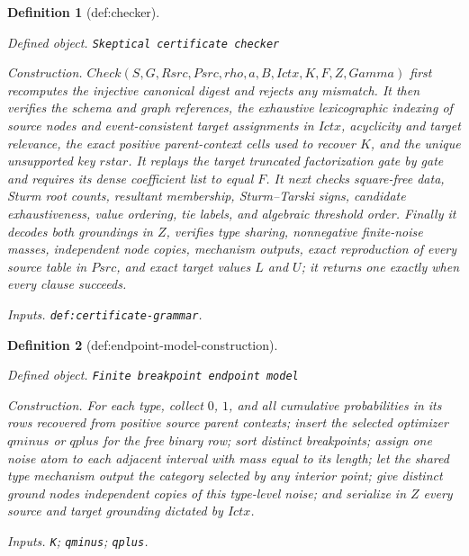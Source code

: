 \documentclass{article}
\newtheorem{definition}{Definition}
\begin{document}
\begin{definition}[def:checker]\label{def:checker}
\par\smallskip\noindent\emph{Defined object.} \texttt{Skeptical certificate checker}
\par\smallskip\noindent\emph{Construction.} \(Check(S,G,Rsrc,Psrc,rho,a,B,Ictx,K,F,Z,Gamma)\) first recomputes the injective canonical digest and rejects any mismatch. It then verifies the schema and graph references, the exhaustive lexicographic indexing of source nodes and event-consistent target assignments in \(Ictx\), acyclicity and target relevance, the exact positive parent-context cells used to recover \(K\), and the unique unsupported key \(rstar\). It replays the target truncated factorization gate by gate and requires its dense coefficient list to equal \(F\). It next checks square-free data, Sturm root counts, resultant membership, Sturm--Tarski signs, candidate exhaustiveness, value ordering, tie labels, and algebraic threshold order. Finally it decodes both groundings in \(Z\), verifies type sharing, nonnegative finite-noise masses, independent node copies, mechanism outputs, exact reproduction of every source table in \(Psrc\), and exact target values \(L\) and \(U\); it returns one exactly when every clause succeeds.
\par\smallskip\noindent\emph{Inputs.} \texttt{def:\allowbreak{}certificate-\allowbreak{}grammar}.
\end{definition}

\begin{definition}[def:endpoint-model-construction]\label{def:endpoint-model-construction}
\par\smallskip\noindent\emph{Defined object.} \texttt{Finite breakpoint endpoint model}
\par\smallskip\noindent\emph{Construction.} For each type, collect \(0\), \(1\), and all cumulative probabilities in its rows recovered from positive source parent contexts; insert the selected optimizer \(qminus\) or \(qplus\) for the free binary row; sort distinct breakpoints; assign one noise atom to each adjacent interval with mass equal to its length; let the shared type mechanism output the category selected by any interior point; give distinct ground nodes independent copies of this type-level noise; and serialize in \(Z\) every source and target grounding dictated by \(Ictx\).
\par\smallskip\noindent\emph{Inputs.} \texttt{K}; \texttt{qminus}; \texttt{qplus}.
\end{definition}
\end{document}
